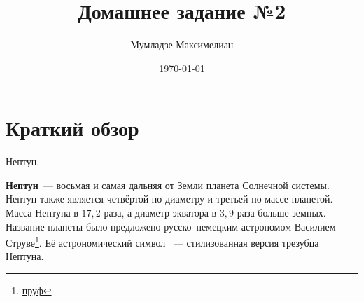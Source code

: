 \documentclass[12pt]{article}
\author{Мумладзе Максимелиан}
\title{Домашнее задание №2}
\date{\today}
\theoremstyle{definition}\newtheorem{defi}{Определение}
\begin{document}
\maketitle

\section{Краткий обзор}
\begin{center}\Huge

Нептун.

\end{center}

\textbf{Нептун}~--- восьмая и самая дальняя от Земли планета Солнечной системы. Нептун также является четвёртой по диаметру и третьей по массе планетой. Масса Нептуна в $17,2$ раза, а диаметр экватора в $3,9$ раза больше земных. Название планеты было предложено русско--немецким астрономом Василием Струве\footnote{\href{http://articles.adsabs.harvard.edu/full/seri/AN.../0025/0000164.000.html}{пруф}}.  Её астрономический символ  ~--- стилизованная версия трезубца Нептуна.
\end{document}
